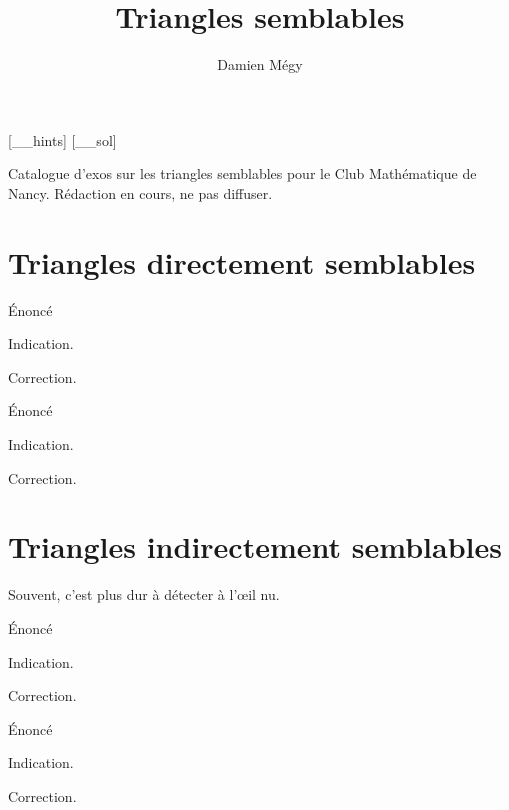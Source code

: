 





[_\jobname_hints]
[_\jobname_sol]


\title{Triangles semblables}
\author{Damien Mégy}
\maketitle

Catalogue d'exos sur les triangles semblables pour le Club Mathématique de Nancy. Rédaction en cours, ne pas diffuser. 

\tableofcontents

\section{Triangles directement semblables}

\begin{exo}
Énoncé
\begin{hint}
Indication.
\end{hint}
\begin{sol}
Correction.
\end{sol}
\end{exo}

\begin{exo}
Énoncé
\begin{hint}
Indication.
\end{hint}
\begin{sol}
Correction.
\end{sol}
\end{exo}


\section{Triangles indirectement semblables}

Souvent, c'est plus dur à détecter à l'\oe il nu.

\begin{exo}
Énoncé
\begin{hint}
Indication.
\end{hint}
\begin{sol}
Correction.
\end{sol}
\end{exo}

\begin{exo}
Énoncé
\begin{hint}
Indication.
\end{hint}
\begin{sol}
Correction.
\end{sol}
\end{exo}






\indications
\correction



